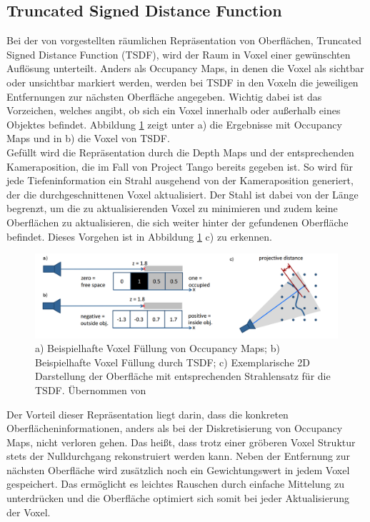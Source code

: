 \subsection{Truncated Signed Distance Function}

Bei der von \citet{curless1996volumetric} vorgestellten räumlichen Repräsentation von Oberflächen, Truncated Signed Distance Function (TSDF), wird der Raum in Voxel einer gewünschten Auflösung unterteilt. Anders als Occupancy Maps, in denen die Voxel als sichtbar oder unsichtbar markiert werden, werden bei TSDF in den Voxeln die jeweiligen Entfernungen zur nächsten Oberfläche angegeben. Wichtig dabei ist das Vorzeichen, welches angibt, ob sich ein Voxel innerhalb oder außerhalb eines Objektes befindet. Abbildung \ref{fig:tsdf} zeigt unter a) die Ergebnisse mit Occupancy Maps und in b) die Voxel von TSDF. \citep{curless1996volumetric} \\

Gefüllt wird die Repräsentation durch die Depth Maps und der entsprechenden Kameraposition, die im Fall von Project Tango bereits gegeben ist. So wird für jede Tiefeninformation ein Strahl ausgehend von der Kameraposition generiert, der die durchgeschnittenen Voxel aktualisiert. Der Stahl ist dabei von der Länge begrenzt, um die zu aktualisierenden Voxel zu minimieren und zudem keine Oberflächen zu aktualisieren, die sich weiter hinter der gefundenen Oberfläche befindet. Dieses Vorgehen ist in Abbildung \ref{fig:tsdf} c) zu erkennen. \citep{Compu66:online} \\

\begin{figure}
  \centering
	\includegraphics[width=1.0\textwidth]{content/images/methods/tsdf.png} 
  \caption{a) Beispielhafte Voxel Füllung von Occupancy Maps; b) Beispielhafte Voxel Füllung durch TSDF; c) Exemplarische 2D Darstellung der Oberfläche mit entsprechenden Strahlensatz für die TSDF. Übernommen von \citet{Compu66:online}}
  \label{fig:tsdf}
\end{figure}

Der Vorteil dieser Repräsentation liegt darin, dass die konkreten Oberflächeninformationen, anders als bei der Diskretisierung von Occupancy Maps, nicht verloren gehen. Das heißt, dass trotz einer gröberen Voxel Struktur stets der Nulldurchgang rekonstruiert werden kann. Neben der Entfernung zur nächsten Oberfläche wird zusätzlich noch ein Gewichtungswert in jedem Voxel gespeichert. Das ermöglicht es leichtes Rauschen durch einfache Mittelung zu unterdrücken und die Oberfläche optimiert sich somit bei jeder Aktualisierung der Voxel. \citep{Compu66:online}\\

